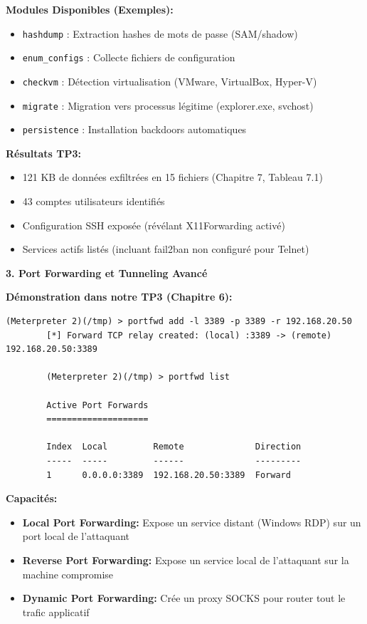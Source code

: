 \documentclass[12pt,a4paper,openany]{report}
\begin{document}
	\textbf{Modules Disponibles (Exemples):}
	\begin{itemize}
		\item \texttt{hashdump} : Extraction hashes de mots de passe (SAM/shadow)
		\item \texttt{enum\_configs} : Collecte fichiers de configuration
		\item \texttt{checkvm} : Détection virtualisation (VMware, VirtualBox, Hyper-V)
		\item \texttt{migrate} : Migration vers processus légitime (explorer.exe, svchost)
		\item \texttt{persistence} : Installation backdoors automatiques
	\end{itemize}
	
	\textbf{Résultats TP3:}
	\begin{itemize}
		\item 121 KB de données exfiltrées en 15 fichiers (Chapitre 7, Tableau 7.1)
		\item 43 comptes utilisateurs identifiés
		\item Configuration SSH exposée (révélant X11Forwarding activé)
		\item Services actifs listés (incluant fail2ban non configuré pour Telnet)
	\end{itemize}
	
	\textbf{3. Port Forwarding et Tunneling Avancé}
	
	\textbf{Démonstration dans notre TP3 (Chapitre 6):}
	
	\begin{lstlisting}[caption=Configuration Tunnel RDP]
		(Meterpreter 2)(/tmp) > portfwd add -l 3389 -p 3389 -r 192.168.20.50
		[*] Forward TCP relay created: (local) :3389 -> (remote) 192.168.20.50:3389
		
		(Meterpreter 2)(/tmp) > portfwd list
		
		Active Port Forwards
		====================
		
		Index  Local         Remote              Direction
		-----  -----         ------              ---------
		1      0.0.0.0:3389  192.168.20.50:3389  Forward
	\end{lstlisting}
	
	\textbf{Capacités:}
	\begin{itemize}
		\item \textbf{Local Port Forwarding:} Expose un service distant (Windows RDP) 
		sur un port local de l'attaquant
		\item \textbf{Reverse Port Forwarding:} Expose un service local de l'attaquant 
		sur la machine compromise
		\item \textbf{Dynamic Port Forwarding:} Crée un proxy SOCKS pour router 
		tout le trafic applicatif
	\end{itemize}
	
\end{document}
